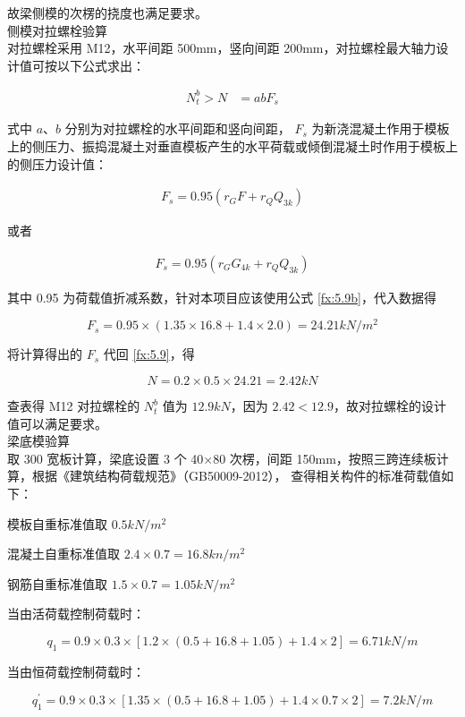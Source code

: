 故梁侧模的次楞的挠度也满足要求。\\

 侧模对拉螺栓验算\\

对拉螺栓采用 M12，水平间距 500mm，竖向间距 200mm，对拉螺栓最大轴力设计值可按以下公式求出：

\begin{align}
    \label{fx:5.9}
    N^b_t>N&=abF_s
\end{align}

式中 $a$、$b$ 分别为对拉螺栓的水平间距和竖向间距， $F_s$ 为新浇混凝土作用于模板上的侧压力、振捣混凝土对垂直模板产生的水平荷载或倾倒混凝土时作用于模板上的侧压力设计值：

\begin{align}
    \label{fx:5.9a}
    F_s=0.95(r_GF+r_QQ_{3k})
\end{align}

或者

\begin{align}
    \label{fx:5.9b}
    F_s=0.95(r_GG_{4k}+r_QQ_{3k})
\end{align}

其中 0.95 为荷载值折减系数，针对本项目应该使用公式 \ref{fx:5.9b}，代入数据得

\[
F_s=0.95\times(1.35\times 16.8+1.4\times 2.0)=24.21 kN/m^2    
\]

将计算得出的 $F_s$ 代回 \ref{fx:5.9}，得

\[N=0.2\times 0.5\times 24.21=2.42 kN\]

查表得 M12 对拉螺栓的 $N_t^b$ 值为 $12.9 kN$，因为 $2.42<12.9$，故对拉螺栓的设计值可以满足要求。\\

 梁底模验算\\

取 300 宽板计算，梁底设置 3 个 40×80 次楞，间距 150mm，按照三跨连续板计算，根据《建筑结构荷载规范》（GB50009-2012），
查得相关构件的标准荷载值如下：

模板自重标准值取 $0.5 kN/m^2$

混凝土自重标准值取 $2.4\times 0.7=16.8 kn/m^2$

钢筋自重标准值取 $1.5\times 0.7=1.05 kN/m^2$

当由活荷载控制荷载时：

\[q_1=0.9\times 0.3\times[1.2\times(0.5+16.8+1.05)+1.4\times 2]=6.71 kN/m\]

当由恒荷载控制荷载时：

\[q_1^{'}=0.9\times 0.3\times[1.35\times(0.5+16.8+1.05)+1.4\times0.7\times 2]=7.2 kN/m\]

